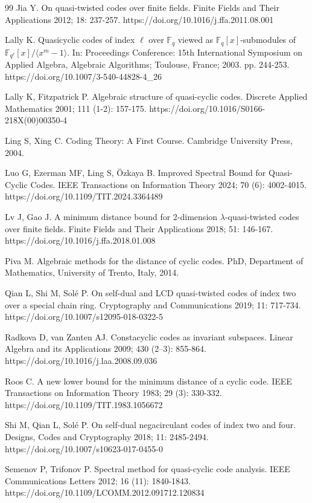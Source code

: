 \documentclass[11pt]{amsart}
\theoremstyle{plain}
\theoremstyle{definition}
\numberwithin{equation}{section}
\newcommand{\Fq}{\mathbb{F}_{q}}
\newcommand{\F}{{\mathbb F}}
\begin{document}
\begin{thebibliography}{99}
 Jia Y. On quasi-twisted codes over finite fields. Finite Fields and Their Applications 2012; 18: 237-257. https://doi.org/10.1016/j.ffa.2011.08.001

 Lally K. Quasicyclic codes of index $\ell$ over $\Fq$ viewed as $\Fq[x]$-submodules of $\F_{q^{\ell}}[x]/ \langle x^m-1\rangle$. In: Proceedings Conference: 15th International Symposium on Applied Algebra, Algebraic Algorithms; Toulouse, France; 2003. pp. 244-253. https://doi.org/10.1007/3-540-44828-4\_26

 Lally K, Fitzpatrick P. Algebraic structure of quasi-cyclic codes. Discrete Applied Mathematics 2001; 111 (1-2): 157-175. https://doi.org/10.1016/S0166-218X(00)00350-4

 Ling S, Xing C. Coding Theory: A First Course. Cambridge University Press, 2004.

 Luo G, Ezerman MF, Ling S, \"Ozkaya B. Improved Spectral Bound for Quasi-Cyclic Codes. IEEE Transactions on Information Theory 2024; 70 (6): 4002-4015. https://doi.org/10.1109/TIT.2024.3364489

 Lv J, Gao J. A minimum distance bound for 2-dimension $\lambda$-quasi-twisted codes over finite fields. Finite Fields and Their Applications 2018; 51: 146-167. https://doi.org/10.1016/j.ffa.2018.01.008

 Piva M. Algebraic methods for the distance of cyclic codes. PhD, Department of Mathematics, University of Trento,  Italy, 2014.

 Qian L, Shi M, Sol\'{e} P. On self-dual and LCD quasi-twisted codes of index two over a special chain ring. Cryptography and Communications 2019; 11: 717-734. https://doi.org/10.1007/s12095-018-0322-5

 Radkova D, van Zanten AJ. Constacyclic codes as invariant subspaces. Linear Algebra and its Applications 2009; 430 (2–3): 855-864. https://doi.org/10.1016/j.laa.2008.09.036

 Roos C. A new lower bound for the minimum distance of a cyclic code. IEEE Transactions on Information Theory 1983; 29 (3): 330-332. https://doi.org/10.1109/TIT.1983.1056672

 Shi M, Qian L, Sol\'{e} P. On self-dual negacirculant codes of index two and four. Designs, Codes and Cryptography 2018; 11: 2485-2494. https://doi.org/10.1007/s10623-017-0455-0

 Semenov P, Trifonov P. Spectral method for quasi-cyclic code analysis. IEEE Communications Letters 2012; 16 (11):  1840-1843. https://doi.org/10.1109/LCOMM.2012.091712.120834


\end{thebibliography}
\end{document}
